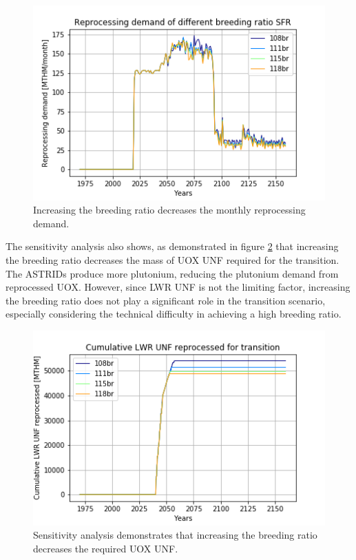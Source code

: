 \begin{figure}[htbp!]
    \begin{center}
        \includegraphics[scale=0.6]{./images/sensitivity/br_tot_rep.png}
    \end{center}
    \caption{Increasing the breeding ratio decreases the monthly reprocessing 
    demand.}
    \label{fig:br_rep}
\end{figure}

The sensitivity analysis also shows, as demonstrated in figure \ref{fig:br_uox} that 
increasing the breeding ratio decreases the mass of \gls{UOX} \gls{UNF} 
required for the transition. The \glspl{ASTRID} produce 
more plutonium, reducing the plutonium demand from 
reprocessed \gls{UOX}. However, since \gls{LWR} \gls{UNF} is not
the limiting factor, increasing the breeding ratio does not play a significant
role in the transition scenario, especially considering the technical difficulty
in achieving a high breeding ratio.

\begin{figure}[htbp!]
    \begin{center}
        \includegraphics[scale=0.6]{./images/sensitivity/br_uox_unf_cum.png}
    \end{center}
    \caption{Sensitivity analysis demonstrates that increasing the breeding 
    ratio decreases the required \gls{UOX} \gls{UNF}. }
    \label{fig:br_uox}
\end{figure}


